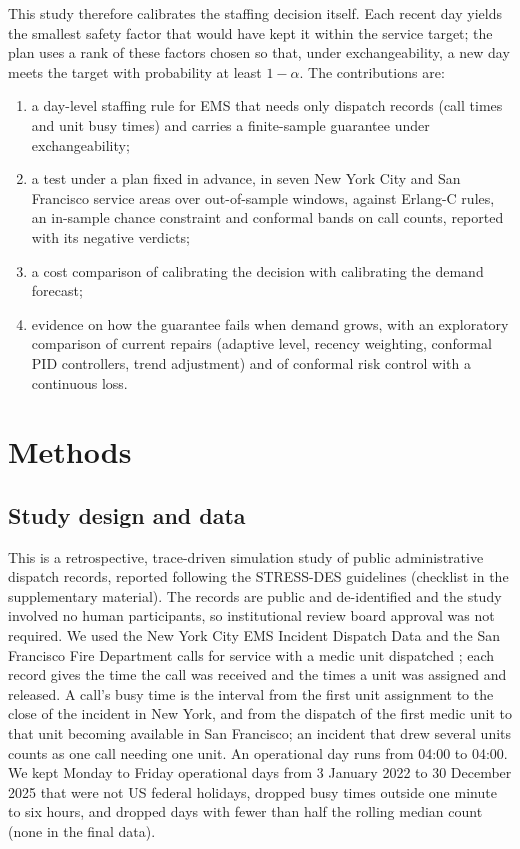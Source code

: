 \documentclass[11pt]{article}
\begin{document}
This study therefore calibrates the staffing decision itself. Each recent day yields the smallest safety factor that would have kept it within the service target; the plan uses a rank of these factors chosen so that, under exchangeability, a new day meets the target with probability at least $1-\alpha$. The contributions are:
\begin{enumerate}
\item a day-level staffing rule for EMS that needs only dispatch records (call times and unit busy times) and carries a finite-sample guarantee under exchangeability;
\item a test under a plan fixed in advance, in seven New York City and San Francisco service areas over  out-of-sample windows, against Erlang-C rules, an in-sample chance constraint and conformal bands on call counts, reported with its negative verdicts;
\item a cost comparison of calibrating the decision with calibrating the demand forecast;
\item evidence on how the guarantee fails when demand grows, with an exploratory comparison of current repairs (adaptive level, recency weighting, conformal PID controllers, trend adjustment) and of conformal risk control with a continuous loss.
\end{enumerate}

\section{Methods}

\subsection{Study design and data}

This is a retrospective, trace-driven simulation study of public administrative dispatch records, reported following the STRESS-DES guidelines \citep{monks2019stress} (checklist in the supplementary material). The records are public and de-identified and the study involved no human participants, so institutional review board approval was not required. We used the New York City EMS Incident Dispatch Data \citep{nycems2026} and the San Francisco Fire Department calls for service with a medic unit dispatched \citep{sffire2026}; each record gives the time the call was received and the times a unit was assigned and released. A call's busy time is the interval from the first unit assignment to the close of the incident in New York, and from the dispatch of the first medic unit to that unit becoming available in San Francisco; an incident that drew several units counts as one call needing one unit. An operational day runs from 04:00 to 04:00. We kept Monday to Friday operational days from 3 January 2022 to 30 December 2025 that were not US federal holidays, dropped busy times outside one minute to six hours, and dropped days with fewer than half the rolling median count (none in the final data).
\end{document}
